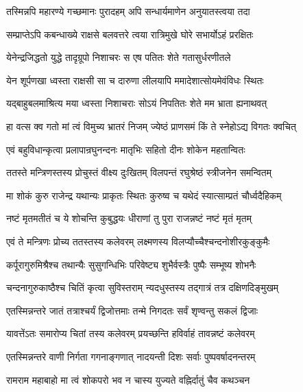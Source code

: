 \twolineshloka
{तस्मिन्नपि महारण्ये गच्छमानः पुरादहम्}
{अपि सन्धार्यमाणेन अनुयातस्त्वया तदा}%

\twolineshloka
{सम्प्राप्तेऽपि कबन्धाख्ये राक्षसे बलवत्तरे}
{त्वया रात्रिमुखे घोरे सभार्योऽहं प्ररक्षितः}%

\twolineshloka
{येनेन्द्रजिद्धतो युद्धे तादृग्रूपो निशाचरः}
{स एष पतितः शेते गतासुर्धरणीतले}%

\twolineshloka
{येन शूर्पणखा ध्वस्ता राक्षसी सा च दारुणा}
{लीलयापि ममादेशात्सोयमेवंविधः स्थितः}%

\twolineshloka
{यद्बाहुबलमाश्रित्य मया ध्वस्ता निशाचराः}
{सोऽयं निपतितः शेते मम भ्राता ह्यनाथवत्}%

\twolineshloka
{हा वत्स क्व गतो मां त्वं विमुच्य भ्रातरं निजम्}
{ज्येष्ठं प्राणसमं किं ते स्नेहोऽद्य विगतः क्वचित्}%


\twolineshloka
{एवं बहुविधान्कृत्वा प्रलापान्रघुनन्दनः}
{मातृभिः सहितो दीनः शोकेन महतान्वितः}%

\twolineshloka
{ततस्ते मन्त्रिणस्तस्य प्रोचुस्तं वीक्ष्य दुःखितम्}
{विलपन्तं रघुश्रेष्ठं स्त्रीजनेन समन्वितम्}%


\twolineshloka
{मा शोकं कुरु राजेन्द्र यथान्यः प्राकृतः स्थितः}
{कुरुष्व च यथेदं स्यात्साम्प्रतं चौर्ध्वदैहिकम्}%

\twolineshloka
{नष्टं मृतमतीतं च ये शोचन्ति कुबुद्धयः}
{धीराणां तु पुरा राजन्नष्टं नष्टं मृतं मृतम्}%

\twolineshloka
{एवं ते मन्त्रिणः प्रोच्य ततस्तस्य कलेवरम्}
{लक्ष्मणस्य विलप्यौच्चैश्चन्दनोशीरकुङ्कुमैः}%

\twolineshloka
{कर्पूरागुरुमिश्रैश्च तथान्यैः सुसुगन्धिभिः}
{परिवेष्ट्य शुभैर्वस्त्रैः पुष्पैः सम्भूष्य शोभनैः}%

\twolineshloka
{चन्दनागुरुकाष्ठैश्च चितिं कृत्वा सुविस्तराम्}
{न्यदधुस्तस्य तद्गात्रं तत्र दक्षिणदिङ्मुखम्}%

\twolineshloka
{एतस्मिन्नन्तरे जातं तत्राश्चर्यं द्विजोत्तमाः}
{तन्मे निगदतः सर्वं शृण्वन्तु सकलं द्विजाः}%

\twolineshloka
{यावत्तेंऽतः समारोप्य चितां तस्य कलेवरम्}
{प्रयच्छन्ति हविर्वाहं तावन्नष्टं कलेवरम्}%

\twolineshloka
{एतस्मिन्नन्तरे वाणी निर्गता गगनाङ्गणात्}
{नादयन्ती दिशः सर्वाः पुष्पवर्षादनन्तरम्}%

\twolineshloka
{रामराम महाबाहो मा त्वं शोकपरो भव}
{न चास्य युज्यते वह्निर्दातुं चैव कथञ्चन}%

